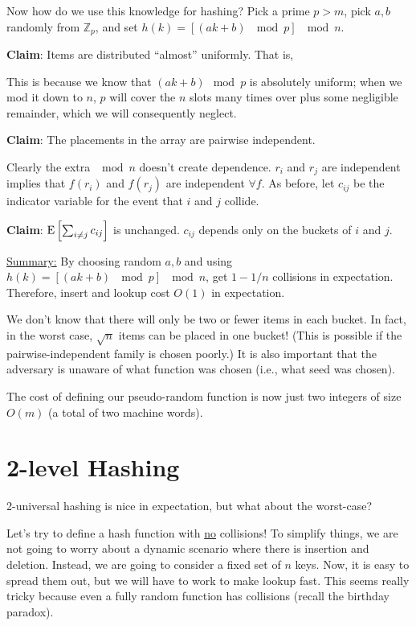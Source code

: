 \documentclass{article}
\newcommand{\E}[1]{\textnormal{E}\left[ #1 \right]}
\begin{document}
Now how do we use this knowledge for hashing?  Pick a prime $p > m$, pick $a,b$ randomly from ${\mathbb Z}_p$, and set $h(k) = [(ak+b)\ \mod p]\ \mod n$.

\textbf{Claim}:
Items are distributed ``almost'' uniformly.  That is,

This is because we know that $(ak+b)\mod p$ is absolutely uniform; when we mod it down to $n$, $p$ will cover the $n$ slots many times over plus some negligible remainder, which we will consequently neglect.

\textbf{Claim}:
The placements in the array are pairwise independent.

Clearly the extra $\mod n$ doesn't create dependence.  $r_i$ and $r_j$ are independent implies that $f(r_i)$ and $f(r_j)$ are independent $\forall f$. As before,
let $c_{ij}$ be the indicator variable for the event that $i$ and $j$ collide.

\textbf{Claim}:
$\E{\sum_{i\not=j} c_{ij} }$ is unchanged.  $c_{ij}$ depends only on the buckets of $i$ and $j$.

\underline{Summary:} By choosing random $a,b$ and using $h(k) = [(ak+b)\ \mod p]\ \mod n$, get $1-1/n$ collisions in expectation.  Therefore, insert and lookup cost $O(1)$ in expectation.

We don't know that there will only be two or fewer items in each bucket.  In fact, in the worst case, $\sqrt{n}$ items can be placed in one bucket!  (This is possible if the pairwise-independent family is chosen poorly.)  It is also important that the adversary is unaware of what function was chosen (i.e., what seed was chosen).

The cost of defining our pseudo-random function is now just two integers of size $O(m)$ (a total of two machine words).

\section{2-level Hashing}

2-universal hashing is nice in expectation, but what about the worst-case?

Let's try to define a hash function with \underline{no} collisions!  To simplify things, we are not going to worry about a dynamic scenario where there is insertion and deletion.  Instead, we are going to consider a fixed set of $n$ keys.  Now, it is easy to spread them out, but we will have to work to make lookup fast.  This seems really tricky because even a fully random function has collisions (recall the birthday paradox).
\end{document}
